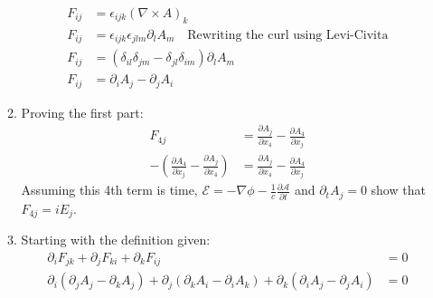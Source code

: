 \documentclass[12pt]{article}
\newcommand{\p}[2]{\frac{\partial #1}{\partial #2}}
\newcommand{\curl}{\nabla\times}
\begin{document}
\begin{enumerate}
\begin{enumerate}
      \begin{align*}
        F_{ij}&=\epsilon_{ijk}(\curl A)_k\\
        F_{ij}&=\epsilon_{ijk}\epsilon_{jlm}\partial_l A_m\quad\text{Rewriting the curl using Levi-Civita}\\
        F_{ij}&=(\delta_{il}\delta_{jm}-\delta_{jl}\delta_{im})\partial_l A_m\\
        F_{ij}&=\partial_i A_j-\partial_j A_i
      \end{align*}
      \item Proving the first part:
      \begin{align*}
        F_{4j}&=\p{A_j}{x_4}-\p{A_4}{x_j}\\
        -(\p{A_4}{x_j}-\p{A_j}{x_4})&=\p{A_j}{x_4}-\p{A_4}{x_j}
      \end{align*}
      Assuming this 4th term is time, $\mathcal{E}=-\nabla\phi-\frac{1}{c}\p{\mathcal{A}}{t}$ and $\partial_t A_j=0$ show that $F_{4j}=iE_j$.
      \item Starting with the definition given:
      \begin{align*}
        \partial_i F_{jk}+\partial_j F_{ki}+\partial_k F_{ij}&=0\\
        \partial_i (\partial_j A_j-\partial_k A_j)+\partial_j (\partial_k A_i-\partial_i A_k)+\partial_k (\partial_i A_j-\partial_j A_i)&=0\\
      \end{align*}
    \end{enumerate}
  \end{enumerate}
\end{document}
